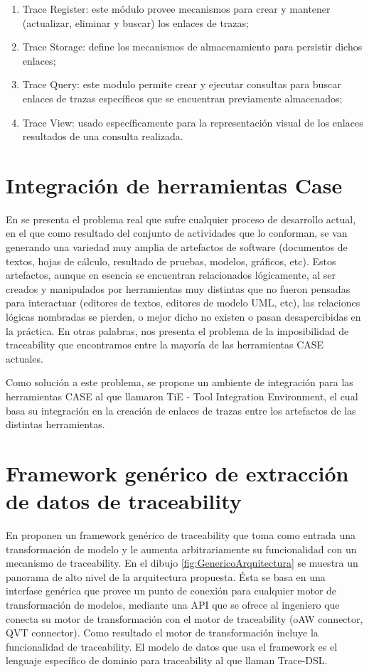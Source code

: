 \documentclass[a4paper,12pt,oneside]{book}
\begin{document}
\begin{enumerate}
\item    Trace Register: este módulo provee mecanismos para crear y mantener (actualizar, eliminar y buscar) los enlaces de trazas;
\item     Trace Storage: define los mecanismos de almacenamiento para persistir dichos enlaces;
\item     Trace Query: este modulo permite crear y ejecutar consultas para buscar enlaces de trazas específicos que se encuentran previamente almacenados;
\item     Trace View: usado específicamente para la representación visual de los enlaces resultados de una consulta realizada.
\end{enumerate}


\section{Integración de herramientas Case}

En \cite{KlarRoseSchurr} se presenta el problema real que sufre cualquier proceso de desarrollo actual, en el que como resultado del conjunto de actividades que lo conforman, se van generando una variedad muy amplia de artefactos de software (documentos de textos, hojas de cálculo, resultado de pruebas, modelos, gráficos, etc). Estos artefactos, aunque en esencia  se encuentran relacionados lógicamente, al ser creados y manipulados por herramientas muy distintas que no fueron pensadas para interactuar (editores de textos, editores de modelo UML, etc), las relaciones lógicas nombradas se pierden, o mejor dicho no existen o pasan desapercibidas en la práctica. En otras palabras, nos presenta el problema de la imposibilidad de traceability que encontramos entre la mayoría de las herramientas CASE actuales. 

Como solución a este problema, se propone un ambiente de integración para las herramientas CASE al que llamaron TiE - Tool Integration Environment, el cual basa su integración en la creación de enlaces de trazas entre los artefactos de las distintas herramientas.

\section{Framework genérico de extracción de datos de traceability}

En \cite{GrammelKastenholz} proponen un framework genérico de traceability que toma como entrada una transformación de modelo y le aumenta arbitrariamente su funcionalidad con un mecanismo de traceability. En el dibujo \ref{fig:GenericoArquitectura} se muestra un panorama de alto nivel de la arquitectura propuesta. Ésta se basa en una interfase genérica que provee un punto de conexión para cualquier motor de transformación de modelos, mediante una API que se ofrece al ingeniero que conecta su motor de transformación con el motor de traceability (oAW connector, QVT connector). Como resultado el motor de transformación incluye la funcionalidad de traceability. El modelo de datos que usa el framework es el lenguaje específico de dominio para traceability al que llaman Trace-DSL.
\end{document}
